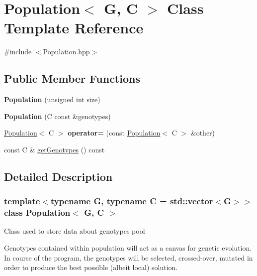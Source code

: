 \hypertarget{classPopulation}{\section{Population$<$ G, C $>$ Class Template Reference}
\label{classPopulation}
}


{\ttfamily \#include $<$Population.\+hpp$>$}

\subsection*{Public Member Functions}
\begin{DoxyCompactItemize}
\item 
\hypertarget{classPopulation_a9469f36ed04e14e7d5de2481b0fc9fa4}{{\bfseries Population} (unsigned int size)}\label{classPopulation_a9469f36ed04e14e7d5de2481b0fc9fa4}

\item 
\hypertarget{classPopulation_adebd5409911b3fd004f4baad2fd74220}{{\bfseries Population} (C const \&genotypes)}\label{classPopulation_adebd5409911b3fd004f4baad2fd74220}

\item 
\hypertarget{classPopulation_a5a3e88831843e897482d7a1aaea37484}{\hyperlink{classPopulation}{Population}$<$ C $>$ {\bfseries operator=} (const \hyperlink{classPopulation}{Population}$<$ C $>$ \&other)}\label{classPopulation_a5a3e88831843e897482d7a1aaea37484}

\item 
const C \& \hyperlink{classPopulation_a4df36cd7e50fdda498ee41f769154d82}{get\+Genotypes} () const 
\end{DoxyCompactItemize}


\subsection{Detailed Description}
\subsubsection*{template$<$typename G, typename C = std\+::vector$<$\+G$>$$>$class Population$<$ G, C $>$}

Class used to store data about genotypes pool

Genotypes contained within population will act as a canvas for genetic evolution. In course of the program, the genotypes will be selected, crossed-\/over, mutated in order to produce the best possible (albeit local) solution. 

